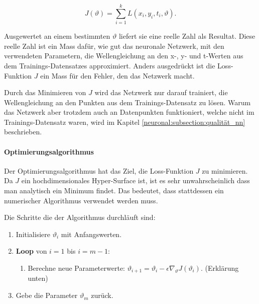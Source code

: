 \begin{equation}
    J(\vartheta) = \sum_{i=1}^{k} L(x_i, y_i, t_i, \vartheta).
    \label{neuronal:loss}
\end{equation}

Ausgewertet an einem bestimmten \( \vartheta \) liefert sie eine reelle Zahl als Resultat.
Diese reelle Zahl ist ein Mass dafür, wie gut das neuronale Netzwerk, mit den verwendeten Parametern, die Wellengleichung an den x-, y- und t-Werten aus dem Trainings-Datensatzes approximiert.
Anders ausgedrückt ist die Loss-Funktion \( J \) ein Mass für den Fehler, den das Netzwerk macht.

Durch das Minimieren von \( J \) wird das Netzwerk nur darauf trainiert, die Wellengleichung an den Punkten aus dem Trainings-Datensatz zu lösen.
Warum das Netzwerk aber trotzdem auch an Datenpunkten funktioniert, welche nicht im Trainings-Datensatz waren, wird im Kapitel \ref{neuronal:subsection:qualität_nn} beschrieben.

\paragraph{Optimierungsalgorithmus}

Der Optimierungsalgorithmus hat das Ziel, die Loss-Funktion \( J \) zu minimieren.
Da \( J \) ein hochdimensionales Hyper-Surface ist, ist es sehr unwahrscheinlich dass man analytisch ein Minimum findet.
Das bedeutet, dass stattdessen ein numerischer Algorithmus verwendet werden muss.

\begin{tcolorbox}[colback=gray!10, colframe=black, boxrule=0.5pt]
    Die Schritte die der Algorithmus durchläuft sind:
    \begin{enumerate}
        \item Initialisiere \( \vartheta_i \) mit Anfangswerten.
        \item \textbf{Loop} von \( i = 1 \) bis \( i = m - 1 \):
        \begin{enumerate}
            \item Berechne neue Parameterwerte: \( \vartheta_{i+1} = \vartheta_i - \epsilon \nabla_\vartheta J\left(\vartheta_i\right) \). (Erklärung unten)
        \end{enumerate}
        \item Gebe die Parameter \( \vartheta_m \) zurück.
    \end{enumerate}
\end{tcolorbox}

